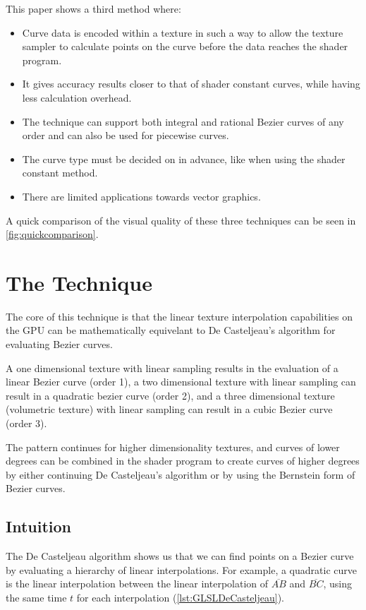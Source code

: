 \documentclass{jcgt}
\begin{document}
This paper shows a third method where:
\begin{itemize}
  \item Curve data is encoded within a texture in such a way to allow the texture sampler to calculate points on the curve before the data reaches the shader program.
  \item It gives accuracy results closer to that of shader constant curves, while having less calculation overhead.
  \item The technique can support both integral and rational Bezier curves of any order and can also be used for piecewise curves.
  \item The curve type must be decided on in advance, like when using the shader constant method.
  \item There are limited applications towards vector graphics.
\end{itemize}

A quick comparison of the visual quality of these three techniques can be seen in \autoref{fig:quickcomparison}.

\section{The Technique}
\label{sec:thetechnique}

The core of this technique is that the linear texture interpolation capabilities on the GPU can be mathematically equivelant to De Casteljeau's algorithm for evaluating Bezier curves.

A one dimensional texture with linear sampling results in the evaluation of a linear Bezier curve (order 1), a two dimensional texture with linear sampling can result in a quadratic bezier curve (order 2), and a three dimensional texture (volumetric texture) with linear sampling can result in a cubic Bezier curve (order 3).

The pattern continues for higher dimensionality textures, and curves of lower degrees can be combined in the shader program to create curves of higher degrees by either continuing De Casteljeau's algorithm or by using the Bernstein form of Bezier curves.

\subsection{Intuition}

The De Casteljeau algorithm shows us that we can find points on a Bezier curve by evaluating a hierarchy of linear interpolations.  For example, a quadratic curve is the linear interpolation between the linear interpolation of {$\overline{AB}$} and {$\overline{BC}$}, using the same time $t$ for each interpolation (\autoref{lst:GLSLDeCasteljeau}).
\end{document}
